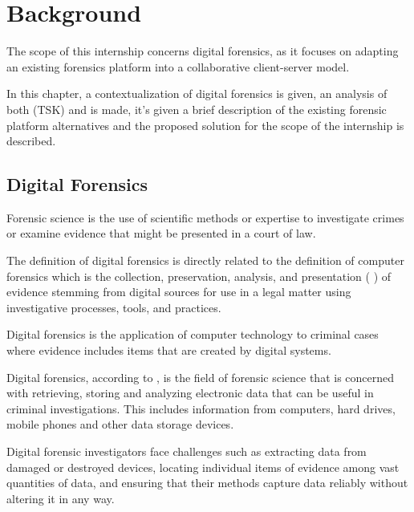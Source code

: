 
\chapter{Background}
\label{ch:background}

The scope of this internship concerns digital forensics, as it focuses on adapting an existing forensics platform into a collaborative client-server model.

In this chapter, a contextualization of digital forensics is given, an analysis of both  (TSK) \cite{sleuthkit} and  \cite{autopsy} is made, it's given a brief description of
the existing forensic platform alternatives and the proposed solution for the scope of the internship is described.

\section{Digital Forensics}

Forensic science is the use of scientific methods or expertise to investigate crimes
or examine evidence that might be presented in a court of law.

The definition of digital forensics is directly related to the definition of
computer forensics which is the collection, preservation, analysis,
and presentation ( \cite{daniels}) of evidence stemming from digital sources for use in a legal matter
using investigative processes, tools, and practices.

Digital forensics is the application of computer technology to criminal cases where evidence
includes items that are created by digital systems.

Digital forensics, according to \citeauthor{nist} \cite{nist}, is the field of forensic science that is concerned with retrieving,
storing and analyzing electronic data that can be useful in criminal investigations.
This includes information from computers, hard drives, mobile phones and other data
storage devices.

Digital forensic investigators face challenges such as extracting data from damaged or destroyed
devices, locating individual items of evidence among vast quantities of data,
and ensuring that their methods capture data reliably without altering it in any way.

